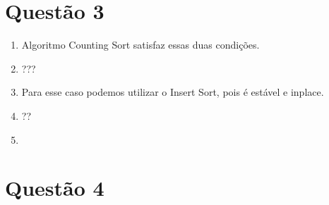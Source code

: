 \documentclass{article}
\begin{document}
\section*{Questão 3}
\begin{enumerate}[label=(\alph*)]
  \item Algoritmo Counting Sort satisfaz essas duas condições.
  \item ???
  \item Para esse caso podemos utilizar o Insert Sort, pois é estável e inplace.
  \item ??
  \item 
\end{enumerate}

\section*{Questão 4}
\end{document}
